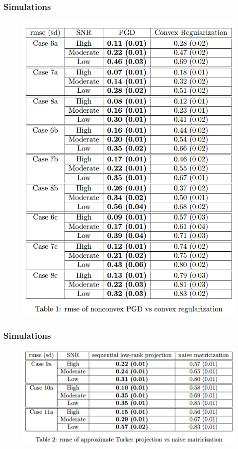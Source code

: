 \documentclass{beamer}
\begin{document}
	\begin{frame}
		\frametitle{Simulations}
		\begin{figure}
			\includegraphics[width=.45\linewidth]{image038.png}
		\end{figure}
	\end{frame}
	
	\begin{frame}
		\frametitle{Simulations}
		\begin{figure}
			\includegraphics[width=.7\linewidth]{image039.png}
		\end{figure}
	\end{frame}
	
	
\end{document}
